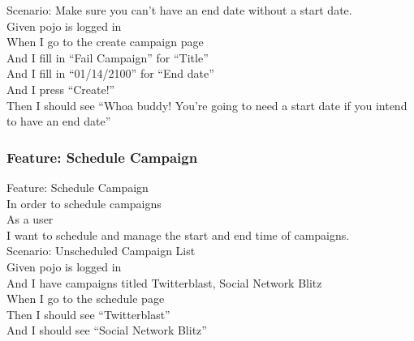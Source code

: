\documentclass[12pt]{article}
\begin{document}
Scenario: Make sure you can't have an end date without a start date. \\
Given pojo is logged in \\
When I go to the create campaign page \\
And I fill in ``Fail Campaign'' for ``Title'' \\
And I fill in ``01/14/2100'' for ``End date'' \\
And I press ``Create!'' \\
Then I should see ``Whoa buddy! You're going to need a start date if you intend to have an end date'' \\

\subsubsection{Feature: Schedule Campaign}

Feature: Schedule Campaign \\
In order to schedule campaigns \\
As a user \\
I want to schedule and manage the start and end time of campaigns. \\

Scenario: Unscheduled Campaign List \\
Given pojo is logged in \\
And I have campaigns titled Twitterblast, Social Network Blitz \\
When I go to the schedule page \\
Then I should see ``Twitterblast'' \\
And I should see ``Social Network Blitz'' \\
\end{document}
